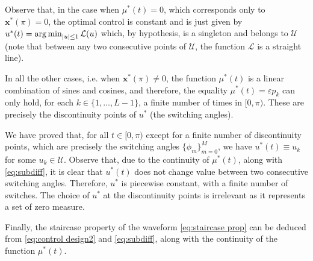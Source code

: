 \documentclass[9pt,shortpaper,twoside,web]{ieeecolor}
\begin{document}
Observe that, in the case when $\mu^\ast(t) = 0$, which corresponds only to $\bm{x}^\ast(\pi) = 0$, the optimal control is constant and is just given by  $u^\ast (t) =  \operatorname*{arg\,min}_{|u|\leq 1} \mathcal{L}(u)$ which, by hypothesis, is a singleton and belongs to $\mathcal{U}$ (note that between any two consecutive points of $\mathcal{U}$, the function $\mathcal{L}$ is a straight line).

In all the other cases,  i.e. when $\bm{x}^\ast(\pi)\neq 0$, the function $\mu^\ast(t)$ is a linear combination of sines and cosines, and therefore, the equality $\mu^\ast (t) = \varepsilon p_k$ can only hold, for each $k\in \{  1, \ldots, L-1 \}$, a finite number of times in $[0,\pi)$. These are precisely the discontinuity points of $u^\ast$ (the switching angles).

We have proved that, for all $t\in [0,\pi)$ except for a finite number of discontinuity points, which are precisely the switching angles $\{\phi_m\}_{m=0}^M$, we have $u^\ast(t)\equiv u_k$ for some $u_k\in\mathcal U$. Observe that, due to the continuity of $\mu^\ast(t)$, along with \eqref{eq:subdiff}, it is clear that $u^\ast(t)$ does not change value between two consecutive switching angles. Therefore, $u^\ast$ is piecewise constant, with a finite number of switches. The choice of $u^\ast$ at the discontinuity points is irrelevant as it represents a set of zero measure.

Finally, the staircase property of the waveform \eqref{eq:staircase prop} can be deduced from \eqref{eq:control design2} and \eqref{eq:subdiff}, along with the continuity of the function $\mu^\ast(t)$.
\end{document}
